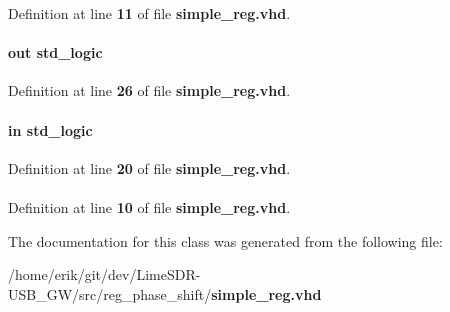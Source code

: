 Definition at line {\bf 11} of file {\bf simple\+\_\+reg.\+vhd}.

\paragraph[{q}]{ {\bfseries \textcolor{keywordflow}{out}\textcolor{vhdlchar}{ }} {\bfseries \textcolor{comment}{std\+\_\+logic}\textcolor{vhdlchar}{ }} \hspace{0.3cm}{\ttfamily [Port]}}\label{classsimple__reg_a508aeb206b1d2b4a168cdb70974c4e0a}


Definition at line {\bf 26} of file {\bf simple\+\_\+reg.\+vhd}.

\paragraph[{reset\+\_\+n}]{ {\bfseries \textcolor{keywordflow}{in}\textcolor{vhdlchar}{ }} {\bfseries \textcolor{comment}{std\+\_\+logic}\textcolor{vhdlchar}{ }} \hspace{0.3cm}{\ttfamily [Port]}}\label{classsimple__reg_a446ea52ed8c4a84181a47d9165ce41a5}


Definition at line {\bf 20} of file {\bf simple\+\_\+reg.\+vhd}.

\paragraph[{std\+\_\+logic\+\_\+1164}]{\hspace{0.3cm}{\ttfamily [Package]}}\label{classsimple__reg_acd03516902501cd1c7296a98e22c6fcb}


Definition at line {\bf 10} of file {\bf simple\+\_\+reg.\+vhd}.



The documentation for this class was generated from the following file\+:\begin{DoxyCompactItemize}
\item 
/home/erik/git/dev/\+Lime\+S\+D\+R-\/\+U\+S\+B\+\_\+\+G\+W/src/reg\+\_\+phase\+\_\+shift/{\bf simple\+\_\+reg.\+vhd}\end{DoxyCompactItemize}
